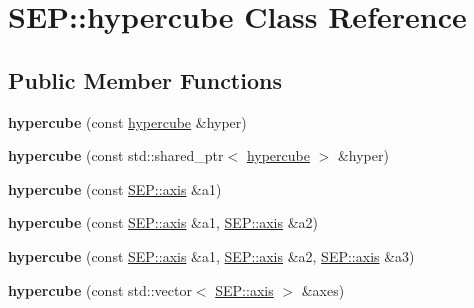 \hypertarget{class_s_e_p_1_1hypercube}{}\section{S\+EP\+:\+:hypercube Class Reference}
\label{class_s_e_p_1_1hypercube}
\subsection*{Public Member Functions}
\begin{DoxyCompactItemize}
\item 
\mbox{\label{class_s_e_p_1_1hypercube_a8f4c60e5b10d88bf7658b5e36188b987}} 
{\bfseries hypercube} (const \hyperlink{class_s_e_p_1_1hypercube}{hypercube} \&hyper)
\item 
\mbox{\label{class_s_e_p_1_1hypercube_a14119e464e086c4cb6e9b5ef1c990f09}} 
{\bfseries hypercube} (const std\+::shared\+\_\+ptr$<$ \hyperlink{class_s_e_p_1_1hypercube}{hypercube} $>$ \&hyper)
\item 
\mbox{\label{class_s_e_p_1_1hypercube_a6488773ccb0e2ab5aac382c2b0701352}} 
{\bfseries hypercube} (const \hyperlink{class_s_e_p_1_1axis}{S\+E\+P\+::axis} \&a1)
\item 
\mbox{\label{class_s_e_p_1_1hypercube_a7b85a8d88ca65c149fe38963c6188c21}} 
{\bfseries hypercube} (const \hyperlink{class_s_e_p_1_1axis}{S\+E\+P\+::axis} \&a1, \hyperlink{class_s_e_p_1_1axis}{S\+E\+P\+::axis} \&a2)
\item 
\mbox{\label{class_s_e_p_1_1hypercube_a524d995a2691e7245a2451bc05a3e463}} 
{\bfseries hypercube} (const \hyperlink{class_s_e_p_1_1axis}{S\+E\+P\+::axis} \&a1, \hyperlink{class_s_e_p_1_1axis}{S\+E\+P\+::axis} \&a2, \hyperlink{class_s_e_p_1_1axis}{S\+E\+P\+::axis} \&a3)
\item 
\mbox{\label{class_s_e_p_1_1hypercube_abdaca3d3c6a65093bd297ee90b143c31}} 
{\bfseries hypercube} (const std\+::vector$<$ \hyperlink{class_s_e_p_1_1axis}{S\+E\+P\+::axis} $>$ \&axes)
\item 
\mbox{\label{class_s_e_p_1_1hypercube_acd76117d57f7ad19bf0352f6ccf94f7c}} 

\end{DoxyCompactItemize}
